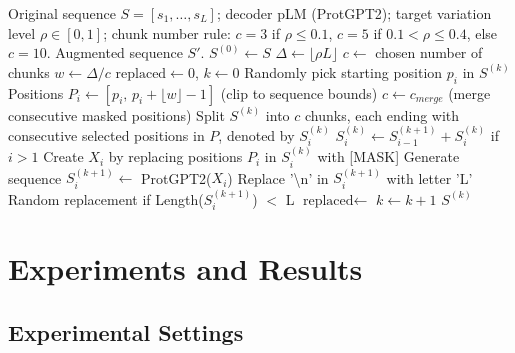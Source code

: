 \documentclass{article}
\begin{document}
\begin{algorithm}[ht]
\caption{ProtAug\_GPT: Decoder-pLM-guided Substitution}
\begin{algorithmic}[1]
\REQUIRE Original sequence $S = [s_1, \dots, s_L]$; decoder pLM (ProtGPT2); target variation level $\rho \in [0,1]$; chunk number rule: $c=3$ if $\rho\le0.1$, $c=5$ if $0.1<\rho\le0.4$, else $c=10$.
\ENSURE Augmented sequence $S'$.
\STATE $S^{(0)} \leftarrow S$
\STATE $\Delta \leftarrow \lfloor\rho L\rfloor$      
\STATE $c \leftarrow$ chosen number of chunks
\STATE $w \leftarrow \Delta / c$         
\STATE $\text{replaced} \leftarrow 0$, $k \leftarrow 0$ 
   \STATE Randomly pick starting position $p_i$ in $S^{(k)}$
   \STATE Positions $P_i \leftarrow [p_i,\, p_i+\lfloor w\rfloor-1]$ (clip to sequence bounds)
\ENDFOR
   \STATE $c \leftarrow c_{merge}$ (merge consecutive masked positions)
   \STATE Split $S^{(k)}$ into $c$ chunks, each ending with consecutive selected positions in $P$, denoted by $S_i^{(k)}$
   \STATE $S_i^{(k)} \leftarrow S_{i-1}^{(k+1)} + S_i^{(k)}$ if $i>1$ 
   \STATE Create $X_i$ by replacing positions $P_i$ in $S_i^{(k)}$ with [MASK]
   \STATE Generate sequence $S_i^{(k+1)} \leftarrow$ ProtGPT2($X_i$)
   \STATE Replace '\textbackslash{n}' in $S_i^{(k+1)}$ with letter 'L'
   \STATE Random replacement if Length($S_i^{(k+1)}$) $<$ L
\ENDFOR
   \STATE $\text{replaced} \leftarrow $ 
   \STATE $k \leftarrow k+1$
\ENDWHILE
\RETURN $S^{(k)}$
\end{algorithmic}
\label{gpt}
\end{algorithm}

\section{Experiments and Results}

\subsection{Experimental Settings}
\end{document}
